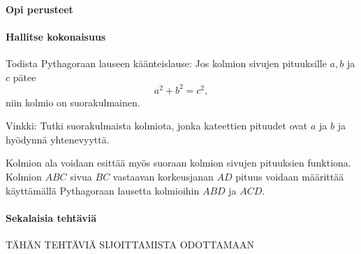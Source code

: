 \begin{tehtavasivu}

\paragraph*{Opi perusteet}

\paragraph*{Hallitse kokonaisuus}

\begin{tehtava}
Todista Pythagoraan lauseen käänteislause: Jos kolmion sivujen pituuksille $a,b$ ja $c$ pätee
\[
a^2+b^2 = c^2,
\]
niin kolmio on suorakulmainen.

\begin{vastaus}
Vinkki: Tutki suorakulmaista kolmiota, jonka kateettien pituudet ovat $a$ ja $b$ ja hyödynnä yhtenevyyttä.
\end{vastaus}
\end{tehtava}

\begin{tehtava}
Kolmion ala voidaan esittää myös suoraan kolmion sivujen pituuksien funktiona. Kolmion $ABC$ sivua $BC$ vastaavan korkeusjanan $AD$ pituus voidaan määrittää käyttämällä Pythagoraan lausetta kolmioihin $ABD$ ja $ACD$.
\begin{alakohdat}
\end{alakohdat}

\begin{vastaus}
\begin{alakohdat}
\end{alakohdat}
\end{vastaus}
\end{tehtava}

\paragraph*{Sekalaisia tehtäviä}

TÄHÄN TEHTÄVIÄ SIJOITTAMISTA ODOTTAMAAN


\end{tehtavasivu}


